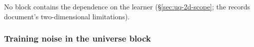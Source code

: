 No block contains the dependence on the learner (\S\ref{sec:uq-2d-scope}; the records document's two-dimensional limitations).

\subsubsection{Training noise in the universe block}
\label{sec:uq-2d-construction}

